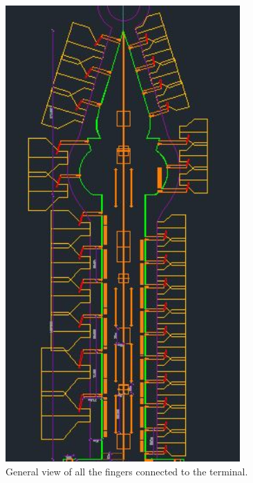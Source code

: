 	\begin{figure}[H]
		\centering
		\includegraphics[clip, trim=0cm 0cm 0cm 0cm, angle=90, width=0.8\textwidth]{./images/serviceway/fingers}
		\caption{General view of all the fingers connected to the terminal.} %
		\label{} %
	\end{figure} 
	
